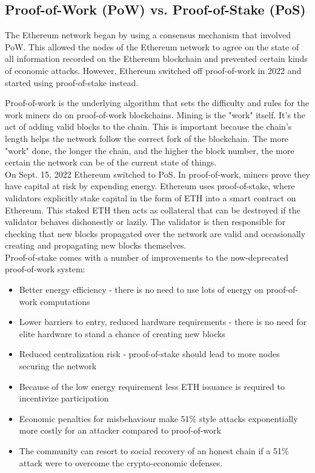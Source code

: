 \documentclass[MSE,Master,english]{twbook}%
\begin{document}
\subsection{Proof-of-Work (\gls{PoW}) vs. Proof-of-Stake (\gls{PoS})}
The Ethereum network began by using a consensus mechanism that involved \ac{PoW}\cite{PoW}. This allowed the nodes of the Ethereum network to agree on the state of all information recorded on the Ethereum blockchain and prevented certain kinds of economic attacks. However, Ethereum switched off proof-of-work in 2022 and started using proof-of-stake instead.

Proof-of-work is the underlying algorithm that sets the difficulty and rules for the work miners do on proof-of-work blockchains. Mining is the "work" itself. It's the act of adding valid blocks to the chain. This is important because the chain's length helps the network follow the correct fork of the blockchain. The more "work" done, the longer the chain, and the higher the block number, the more certain the network can be of the current state of things. \\

On Sept. 15, 2022 Ethereum switched to \ac{PoS}\cite{PoS}. In proof-of-work, miners prove they have capital at risk by expending energy. Ethereum uses proof-of-stake, where validators explicitly stake capital in the form of ETH into a smart contract on Ethereum. This staked ETH then acts as collateral that can be destroyed if the validator behaves dishonestly or lazily. The validator is then responsible for checking that new blocks propagated over the network are valid and occasionally creating and propagating new blocks themselves. \\

Proof-of-stake comes with a number of improvements to the now-deprecated proof-of-work system:

\begin{itemize}
  \item Better energy efficiency - there is no need to use lots of energy on proof-of-work computations
  \item Lower barriers to entry, reduced hardware requirements - there is no need for elite hardware to stand a chance of creating new blocks
  \item Reduced centralization risk - proof-of-stake should lead to more nodes securing the network
  \item Because of the low energy requirement less ETH issuance is required to incentivize participation
  \item Economic penalties for misbehaviour make 51\% style attacks exponentially more costly for an attacker compared to proof-of-work
  \item The community can resort to social recovery of an honest chain if a 51\% attack were to overcome the crypto-economic defenses.
\end{itemize}
\end{document}
